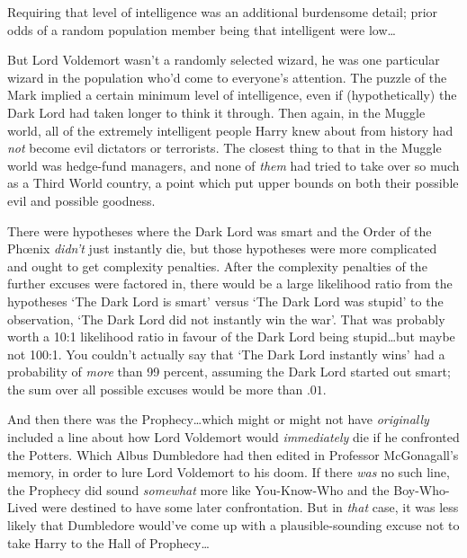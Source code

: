 Requiring that level of intelligence was an additional burdensome detail; prior odds of a random population member being that intelligent were low…

But Lord Voldemort wasn’t a randomly selected wizard, he was one particular wizard in the population who’d come to everyone’s attention. The puzzle of the Mark implied a certain minimum level of intelligence, even if (hypothetically) the Dark Lord had taken longer to think it through. Then again, in the Muggle world, all of the extremely intelligent people Harry knew about from history had \emph{not} become evil dictators or terrorists. The closest thing to that in the Muggle world was hedge-fund managers, and none of \emph{them} had tried to take over so much as a Third World country, a point which put upper bounds on both their possible evil and possible goodness.

There were hypotheses where the Dark Lord was smart and the Order of the Phœnix \emph{didn’t} just instantly die, but those hypotheses were more complicated and ought to get complexity penalties. After the complexity penalties of the further excuses were factored in, there would be a large likelihood ratio from the hypotheses ‘The Dark Lord is smart’ versus ‘The Dark Lord was stupid’ to the observation, ‘The Dark Lord did not instantly win the war’. That was probably worth a 10:1 likelihood ratio in favour of the Dark Lord being stupid…but maybe not 100:1. You couldn’t actually say that ‘The Dark Lord instantly wins’ had a probability of \emph{more} than 99 percent, assuming the Dark Lord started out smart; the sum over all possible excuses would be more than $.01$.

And then there was the Prophecy…which might or might not have
\emph{originally} included a line about how Lord Voldemort would
\emph{immediately} die if he confronted the Potters. Which Albus Dumbledore had then edited in Professor McGonagall’s memory, in order to lure Lord Voldemort to his doom. If there \emph{was} no such line, the Prophecy did sound \emph{somewhat} more like You-Know-Who and the Boy-Who-Lived were destined to have some later confrontation. But in \emph{that} case, it was less likely that Dumbledore would’ve come up with a plausible-sounding excuse not to take Harry to the Hall of Prophecy…

